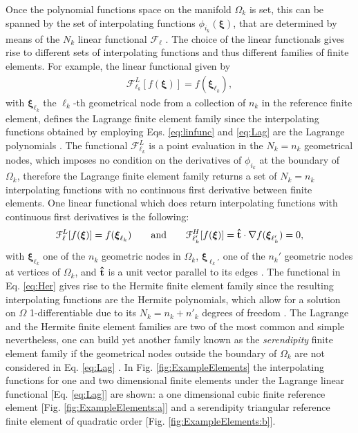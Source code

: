 Once the polynomial functions space on the manifold $\Omega_k$ is set, this can be spanned by the set of interpolating functions $\phi_{i_k}(\boldsymbol{\xi})$, that are determined by means of the $N_k$ linear functional  $\mathcal{F}_\ell$ \cite{larson_finite_2013}.   The choice of the  linear functionals gives rise to different sets of interpolating functions and thus different families of finite elements. For example, the linear functional given by
\begin{align}
 \mathcal{F}^{L}_{\ell_k}[f(\boldsymbol{\xi})] = f(\boldsymbol{\xi}_{\ell_k}) ,
\label{eq:Lag}
\end{align}
%
with  $\boldsymbol{\xi}_{\ell_k}$ the $\ell_k$-th  geometrical node from a collection of $n_k$ in the reference finite element, defines the Lagrange finite element family since the  interpolating functions obtained by employing Eqs. \eqref{eq:linfunc} and \eqref{eq:Lag} are the Lagrange polynomials \cite{larson_finite_2013,dhatt_finite_2012,fletcher_computational_1984}. The functional $\mathcal{F}^{L}_{\ell_k}$ is a point evaluation in the $N_k = n_k$  geometrical nodes, which imposes no condition on the derivatives of $\phi_{i_k}$ at the boundary of $\Omega_k$, therefore the Lagrange finite element family returns a set of $N_k = n_k$ interpolating functions with no continuous first derivative between finite elements. One linear functional which does return interpolating functions with continuous first derivatives is the following:
%
%
%
\begin{align}
     \mathcal{F}^{L}_\ell[f(\boldsymbol{\xi})] = f(\boldsymbol{\xi}_{\ell_k})
     \qquad
     \text{and}
     \qquad
     \mathcal{F}^{H}_{\ell_k'}[f(\boldsymbol{\xi})] = \vu{t}\cdot\nabla  f(\boldsymbol{\xi}_{\ell_k'}) = 0,
\label{eq:Her}
\end{align}
%
with $\boldsymbol{\xi}_{\ell_k}$ one of the $n_k$ geometric nodes in $\Omega_k$, $\boldsymbol{\xi}_{\ell_k'}$ one of the $n_k'$  geometric nodes at vertices of $\Omega_k$, and $\vu{t}$ is a unit vector parallel to its edges \cite{larson_finite_2013}. The functional in Eq. \eqref{eq:Her} gives rise to the Hermite finite element family since the resulting interpolating functions are the Hermite polynomials, which allow for a solution on $\Omega$ 1-differentiable due to its $N_k = n_k +  n'_k$ degrees of freedom \cite{dhatt_finite_2012,larson_finite_2013}. The Lagrange and the Hermite finite element families are two of the most common and simple nevertheless, one can build yet another family known as the \textit{serendipity} finite element family  if the geometrical nodes outside the boundary of $\Omega_k$ are not considered in Eq. \eqref{eq:Lag} \cite{fletcher_computational_1984}. In Fig. \ref{fig:ExampleElements} the interpolating functions for one and two dimensional finite elements under the Lagrange linear functional [Eq. \eqref{eq:Lag}] are shown:  a one dimensional cubic finite reference element [Fig. \ref{fig:ExampleElements:a}] and a serendipity triangular reference finite element of quadratic order [Fig. \ref{fig:ExampleElements:b}].

